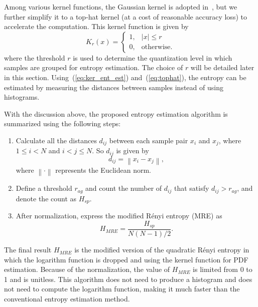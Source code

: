 \documentclass[journal,comsoc]{IEEEtran}
\begin{document}
Among various kernel functions, the Gaussian kernel is adopted in~\cite{Principe2000a}, but we further simplify it to a top-hat kernel (at a cost of reasonable accuracy loss) to accelerate the computation. 
This kernel function is given by
\begin{equation}
{\displaystyle K_{r}(x)={\begin{cases}1,&|x|\leq r\\0,&{\mbox{otherwise.}}\end{cases}}}
\label{eq:tophat}
\end{equation}
where the threshold \(r\) is used to determine the quantization level in which samples are grouped for entropy estimation.
The choice of \(r\) will be detailed later in this section.
% 
% 
Using~(\ref{eq:ker_ent_est}) and~(\ref{eq:tophat}), the entropy can be estimated by  measuring the distances between samples instead of using histograms.


With the discussion above, the proposed entropy estimation algorithm is summarized using the following steps:
\begin{enumerate}
\item Calculate all the distances \(d_{ij}\) between each sample pair \(x_i\) and \(x_j\), where \(1\le i<N\) and \( i<j \le N\). 
So \(d_{ij}\) is given by
 \begin{equation}
d_{ij}=\left\|x_i-x_j \right\|,
\label{eq:distance}
\end{equation}
where \(\left\| \cdot \right\|\) represents the Euclidean norm.
\item Define a threshold \(r_{ag}\) and count the number of \(d_{ij}\) that satisfy $d_{ij}>r_{ag}$, and denote the count as $H_{sp}$.
\item After normalization, express the modified R\'enyi entropy (MRE) as
\begin{equation}
H_{MRE}= \frac{ H_{sp}}{ N(N-1)/2}.
\label{eq:entorpy_ad}
\end{equation}
\end{enumerate}



The final result \(H_{MRE}\) is the modified version of the quadratic R\'enyi entropy in which the logarithm function is dropped and using the kernel function for PDF estimation.
Because of the normalization, the value of $H_{MRE}$ is limited from 0 to 1 and is unitless.
This algorithm does not need to produce a histogram and does not need to compute the logarithm function, making it much faster than the conventional entropy estimation method.
\end{document}
